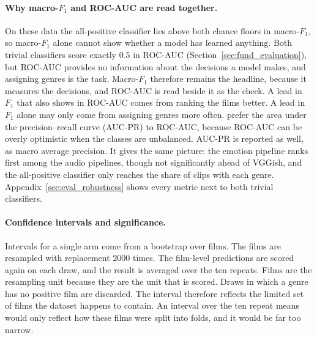 \paragraph{Why macro-$F_1$ and ROC-AUC are read together.} On these data the all-positive classifier lies above both chance floors in macro-$F_1$, so macro-$F_1$ alone cannot show whether a model has learned anything. Both trivial classifiers score exactly 0.5 in ROC-AUC (Section~\ref{sec:fund_evaluation}), but ROC-AUC provides no information about the decisions a model makes, and assigning genres is the task. Macro-$F_1$ therefore remains the headline, because it measures the decisions, and ROC-AUC is read beside it as the check. A lead in $F_1$ that also shows in ROC-AUC comes from ranking the films better. A lead in $F_1$ alone may only come from assigning genres more often. \citet{mangolin2020multimodal} prefer the area under the precision--recall curve (AUC-PR) to ROC-AUC, because ROC-AUC can be overly optimistic when the classes are unbalanced. AUC-PR is reported as well, as macro average precision. It gives the same picture: the emotion pipeline ranks first among the audio pipelines, though not significantly ahead of VGGish, and the all-positive classifier only reaches the share of clips with each genre. Appendix~\ref{sec:eval_robustness} shows every metric next to both trivial classifiers.

\paragraph{Confidence intervals and significance.} Intervals for a single arm come from a bootstrap over films. The films are resampled with replacement 2000 times. The film-level predictions are scored again on each draw, and the result is averaged over the ten repeats. Films are the resampling unit because they are the unit that is scored. Draws in which a genre has no positive film are discarded. The interval therefore reflects the limited set of films the dataset happens to contain. An interval over the ten repeat means would only reflect how these films were split into folds, and it would be far too narrow.

